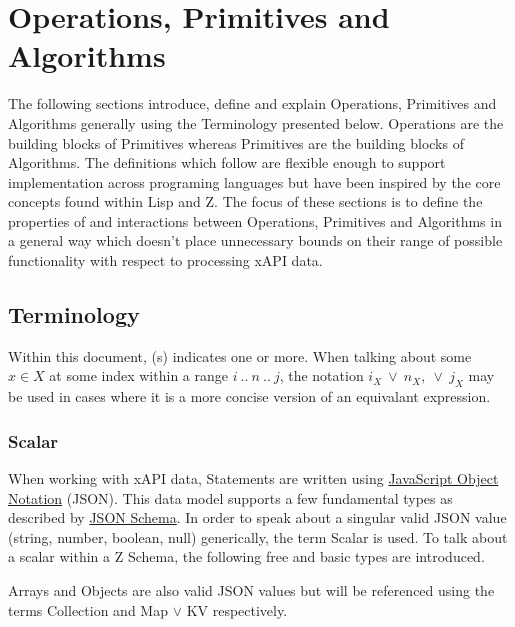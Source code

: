 \documentclass[../main.tex]{subfiles}
\begin{document}
\section{Operations, Primitives and Algorithms}
The following sections introduce, define and explain Operations, Primitives and Algorithms generally using the Terminology presented below. Operations are the building blocks of Primitives whereas Primitives are the building blocks of Algorithms. The definitions which follow are flexible enough to support implementation across programing languages but have been inspired by the core concepts found within Lisp and Z. The focus of these sections is to define the properties of and interactions between Operations, Primitives and Algorithms in a general way which doesn't place unnecessary bounds on their range of possible functionality with respect to processing xAPI data.

\subsection{Terminology}

Within this document, (s) indicates one or more.
When talking about some $x \in X$ at some index within a range $i~..~n~..~j$, the notation $i_{X} ~\lor ~n_{X}, ~\lor ~j_{X}$ may be used in cases where it is a more concise version of an equivalant expression.

\subsubsection{Scalar}
When working with xAPI data, Statements are written using \href{https://www.json.org/}{JavaScript Object Notation} (JSON).
This data model supports a few fundamental types as described by \href{https://json-schema.org/understanding-json-schema/reference/type.html}{JSON Schema}.
In order to speak about a singular valid JSON value (string, number, boolean, null) generically, the term Scalar is used.
To talk about a scalar within a Z Schema, the following free and basic types are introduced.
Arrays and Objects are also valid JSON values but will be referenced using the terms Collection and Map $\lor$ KV respectively.
\end{document}
